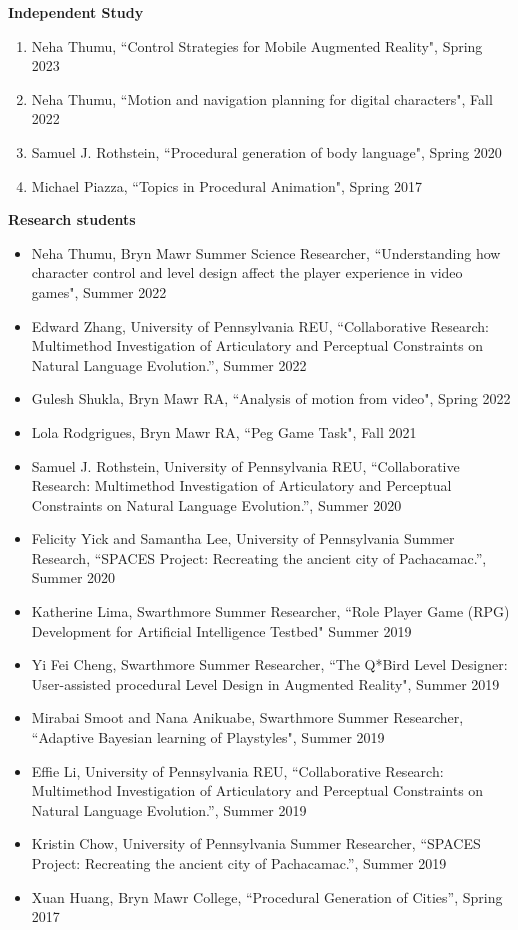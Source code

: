 {\bf Independent Study}
\vspace{-1.0em}

\begin{enumerate}[leftmargin=*,label={}]
\item Neha Thumu, ``Control Strategies for Mobile Augmented Reality", Spring 2023
\item Neha Thumu, ``Motion and navigation planning for digital characters", Fall 2022
\item Samuel J. Rothstein, ``Procedural generation of body language", Spring 2020
\item Michael Piazza, ``Topics in Procedural Animation", Spring 2017
\end{enumerate}

{\bf Research students} 
\vspace{-1.0em}

\begin{itemize}[leftmargin=*,label={}]
\item Neha Thumu, Bryn Mawr Summer Science Researcher, ``Understanding how character control and level design affect the player experience in video games", Summer 2022
\item Edward Zhang, University of Pennsylvania REU, ``Collaborative Research: Multimethod Investigation of Articulatory and Perceptual Constraints on Natural Language Evolution.'', Summer 2022 
\item Gulesh Shukla, Bryn Mawr RA, ``Analysis of motion from video", Spring 2022
\item Lola Rodgrigues, Bryn Mawr RA, ``Peg Game Task", Fall 2021
\item Samuel J. Rothstein, University of Pennsylvania REU, ``Collaborative Research: Multimethod Investigation of Articulatory and Perceptual Constraints on Natural Language Evolution.'', Summer 2020 
\item Felicity Yick and Samantha Lee, University of Pennsylvania Summer Research, ``SPACES Project: Recreating the ancient city of Pachacamac.'', Summer 2020 
\item Katherine Lima, Swarthmore Summer Researcher, ``Role Player Game (RPG) Development for Artificial Intelligence Testbed" Summer 2019
\item Yi Fei Cheng, Swarthmore Summer Researcher, ``The Q*Bird Level Designer: User-assisted procedural Level Design in Augmented Reality", Summer 2019
\item Mirabai Smoot and Nana Anikuabe, Swarthmore Summer Researcher, ``Adaptive Bayesian learning of Playstyles", Summer 2019 
\item Effie Li, University of Pennsylvania REU, ``Collaborative Research: Multimethod Investigation of Articulatory and Perceptual Constraints on Natural Language Evolution.'', Summer 2019 
\item Kristin Chow, University of Pennsylvania Summer Researcher, ``SPACES Project: Recreating the ancient city of Pachacamac.'', Summer 2019 
\item Xuan Huang, Bryn Mawr College, ``Procedural Generation of Cities'', Spring 2017
\end{itemize}

